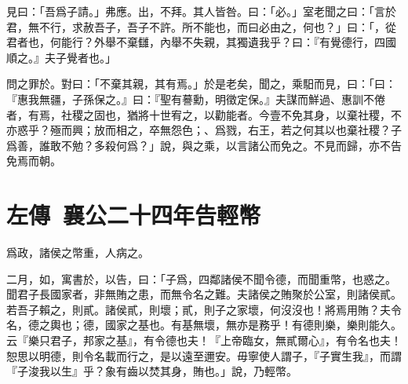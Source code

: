 見曰：「吾爲子請。」弗應。出，不拜。其人皆咎。曰：「必。」室老聞之曰：「言於君，無不行，求赦吾子，吾子不許。所不能也，而曰必由之，何也？」曰：「，從君者也，何能行？外舉不棄讎，內舉不失親，其獨遺我乎？曰：『有覺德行，四國順之。』夫子覺者也。」

問之罪於。對曰：「不棄其親，其有焉。」於是老矣，聞之，乘馹而見，曰：「曰：『惠我無疆，子孫保之。』曰：『聖有謩勳，明徵定保。』夫謀而鮮過、惠訓不倦者，有焉，社稷之固也，猶將十世宥之，以勸能者。今壹不免其身，以棄社稷，不亦惑乎？殛而興；放而相之，卒無怨色；、爲戮，右王，若之何其以也棄社稷？子爲善，誰敢不勉？多殺何爲？」說，與之乘，以言諸公而免之。不見而歸，亦不告免焉而朝。

\theendnotes

\section[子產告范宣子輕幣\quad{\small 左傳 襄公二十四年}]{{\normalsize 左傳\ 襄公二十四年}\quad {}告輕幣}
爲政，諸侯之幣重，人病之。

二月，如，寓書於，以告，曰：「子爲，四鄰諸侯不聞令德，而聞重幣，也惑之。聞君子長國家者，非無賄之患，而無令名之難。夫諸侯之賄聚於公室，則諸侯貳。若吾子賴之，則貳。諸侯貳，則壞；貳，則子之家壞，何沒沒也！將焉用賄？夫令名，德之輿也；德，國家之基也。有基無壞，無亦是務乎！有德則樂，樂則能久。云『樂只君子，邦家之基』，有令德也夫！『上帝臨女，無貳爾心』，有令名也夫！恕思以明德，則令名載而行之，是以遠至邇安。毋寧使人謂子，『子實生我』，而謂『子浚我以生』乎？象有齒以焚其身，賄也。」說，乃輕幣。

